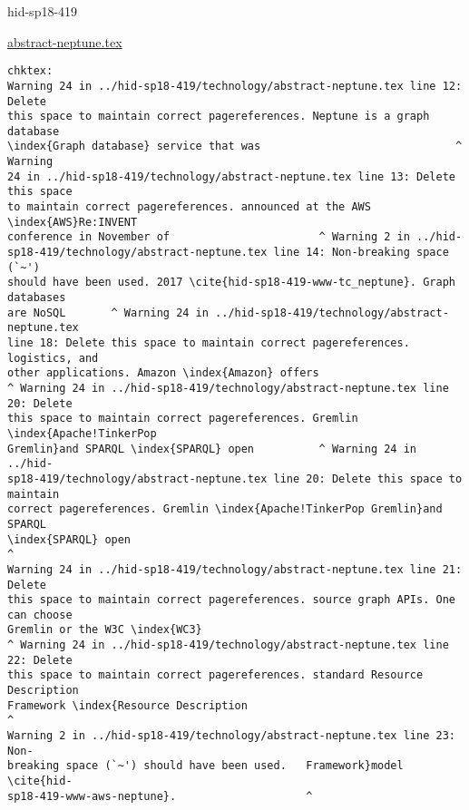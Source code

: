 \begin{IU}

hid-sp18-419

\href{https://github.com/cloudmesh-community/hid-sp18-419/blob/master//technology/abstract-neptune.tex}{abstract-neptune.tex}

\begin{tiny}
\begin{verbatim}
chktex:
Warning 24 in ../hid-sp18-419/technology/abstract-neptune.tex line 12: Delete
this space to maintain correct pagereferences. Neptune is a graph database
\index{Graph database} service that was                              ^ Warning
24 in ../hid-sp18-419/technology/abstract-neptune.tex line 13: Delete this space
to maintain correct pagereferences. announced at the AWS \index{AWS}Re:INVENT
conference in November of                       ^ Warning 2 in ../hid-
sp18-419/technology/abstract-neptune.tex line 14: Non-breaking space (`~')
should have been used. 2017 \cite{hid-sp18-419-www-tc_neptune}. Graph databases
are NoSQL       ^ Warning 24 in ../hid-sp18-419/technology/abstract-neptune.tex
line 18: Delete this space to maintain correct pagereferences. logistics, and
other applications. Amazon \index{Amazon} offers
^ Warning 24 in ../hid-sp18-419/technology/abstract-neptune.tex line 20: Delete
this space to maintain correct pagereferences. Gremlin \index{Apache!TinkerPop
Gremlin}and SPARQL \index{SPARQL} open          ^ Warning 24 in ../hid-
sp18-419/technology/abstract-neptune.tex line 20: Delete this space to maintain
correct pagereferences. Gremlin \index{Apache!TinkerPop Gremlin}and SPARQL
\index{SPARQL} open                                                     ^
Warning 24 in ../hid-sp18-419/technology/abstract-neptune.tex line 21: Delete
this space to maintain correct pagereferences. source graph APIs. One can choose
Gremlin or the W3C \index{WC3}
^ Warning 24 in ../hid-sp18-419/technology/abstract-neptune.tex line 22: Delete
this space to maintain correct pagereferences. standard Resource Description
Framework \index{Resource Description                                          ^
Warning 2 in ../hid-sp18-419/technology/abstract-neptune.tex line 23: Non-
breaking space (`~') should have been used.   Framework}model \cite{hid-
sp18-419-www-aws-neptune}.                    ^
\end{verbatim}
\end{tiny}
\end{IU}



